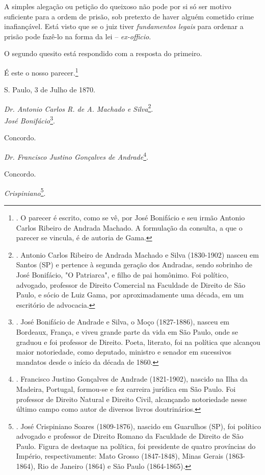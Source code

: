 A simples alegação ou petição do queixoso não pode por si só ser motivo
suficiente para a ordem de prisão, sob pretexto de haver alguém cometido
crime inafiançável. Está visto que se o juiz tiver \emph{fundamentos
legais} para ordenar a prisão pode fazê-lo na forma da lei --
\emph{ex-officio}.

O segundo quesito está respondido com a resposta do primeiro.

É este o nosso parecer.\footnote{. O parecer é escrito, como se vê, por
  José Bonifácio e seu irmão Antonio Carlos Ribeiro de Andrada Machado.
  A formulação da consulta, a que o parecer se vincula, é de autoria de
  Gama.}

S. Paulo, 3 de Julho de 1870.

\emph{Dr. Antonio Carlos R. de A. Machado e Silva}\footnote{. Antonio
  Carlos Ribeiro de Andrada Machado e Silva (1830-1902) nasceu em Santos
  (SP) e pertence à segunda geração dos Andradas, sendo sobrinho de José
  Bonifácio, "O Patriarca", e filho de pai homônimo. Foi político,
  advogado, professor de Direito Comercial na Faculdade de Direito de
  São Paulo, e sócio de Luiz Gama, por aproximadamente uma década, em um
  escritório de advocacia.}.\\
\emph{José Bonifácio}\footnote{. José Bonifácio de Andrade e Silva, o
  Moço (1827-1886), nasceu em Bordeaux, França, e viveu grande parte da
  vida em São Paulo, onde se graduou e foi professor de Direito. Poeta,
  literato, foi na política que alcançou maior notoriedade, como
  deputado, ministro e senador em sucessivos mandatos desde o início da
  década de 1860.}.

Concordo.

\emph{Dr. Francisco Justino Gonçalves de Andrade}\footnote{. Francisco
  Justino Gonçalves de Andrade (1821-1902), nascido na Ilha da Madeira,
  Portugal, formou-se e fez carreira jurídica em São Paulo. Foi
  professor de Direito Natural e Direito Civil, alcançando notoriedade
  nesse último campo como autor de diversos livros doutrinários.}.

Concordo.

\emph{Crispiniano}\footnote{. José Crispiniano Soares (1809-1876),
  nascido em Guarulhos (SP), foi político advogado e professor de
  Direito Romano da Faculdade de Direito de São Paulo. Figura de
  destaque na política, foi presidente de quatro províncias do Império,
  respectivamente: Mato Grosso (1847-1848), Minas Gerais (1863-1864),
  Rio de Janeiro (1864) e São Paulo (1864-1865).}.

